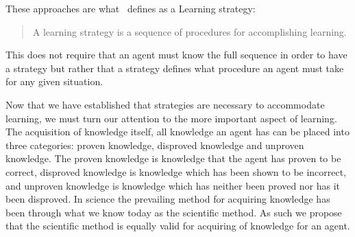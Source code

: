 \documentclass[\master/Master.tex]{subfiles}
\begin{document}
	
	These approaches are what~\cite{tobias1990a} defines as a Learning strategy:
	
\begin{quote}
	A learning strategy is a sequence of procedures for accomplishing learning.
\end{quote}
	
	This does not require that an agent must know the full sequence in order to have a strategy but rather that a strategy defines what procedure an agent must take for any given situation.

	Now that we have established that strategies are necessary to accommodate learning, we must turn our attention to the more important aspect of learning. 
	The acquisition of knowledge itself, all knowledge an agent has can be placed into three categories: proven knowledge, disproved knowledge and unproven knowledge. 
	The proven knowledge is knowledge that the agent has proven to be correct, disproved knowledge is knowledge which has been shown to be incorrect, and unproven knowledge is knowledge which has neither been proved nor has it been disproved.
	In science the prevailing method for acquiring knowledge has been through what we know today as the scientific method. 
	As such we propose that the scientific method is equally valid for acquiring of knowledge for an agent.
	
	
	
	
	
\end{document}
